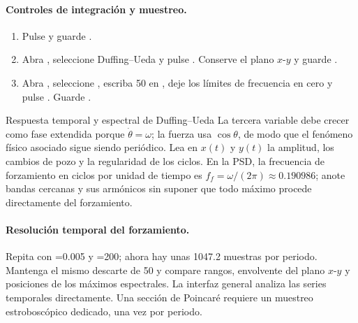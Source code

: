 \paragraph{Controles de integración y muestreo.}
\begin{enumerate}
  \item Pulse  y guarde
  .
  \item Abra , seleccione Duffing--Ueda y pulse
  . Conserve el plano \(x\)-\(y\) y guarde
  .
  \item Abra , seleccione
  , escriba 50 en
  , deje los límites de frecuencia en cero y
  pulse . Guarde
  .
\end{enumerate}

\begin{cajaverde}{Respuesta temporal y espectral de Duffing--Ueda}
La tercera variable debe crecer como fase extendida porque
\(\dot\theta=\omega\); la fuerza usa \(\cos\theta\), de modo que el fenómeno
físico asociado sigue siendo periódico. Lea en \(x(t)\) y \(y(t)\) la amplitud,
los cambios de pozo y la regularidad de los ciclos. En la PSD, la frecuencia de
forzamiento en ciclos por unidad de tiempo es
\(f_f=\omega/(2\pi)\approx0.190986\); anote bandas cercanas y sus armónicos sin
suponer que todo máximo procede directamente del forzamiento.
\end{cajaverde}


\paragraph{Resolución temporal del forzamiento.}
Repita con =0.005 y =200; ahora hay unas
1047.2 muestras por periodo. Mantenga el mismo descarte de 50 y compare rangos,
envolvente del plano \(x\)-\(y\) y posiciones de los máximos espectrales. La
interfaz general analiza las series temporales directamente. Una sección de
Poincaré requiere un muestreo estroboscópico dedicado, una vez por periodo.

